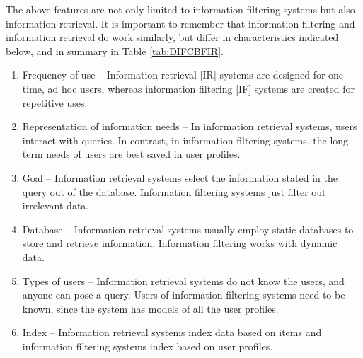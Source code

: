 The above features are not only limited to information filtering systems but also information retrieval. It is important to remember that information filtering and information retrieval do work similarly, but differ in characteristics indicated below, and in summary in Table \ref{tab:DIFCBFIR}.

\begin{enumerate}
    \item Frequency of use – Information retrieval [IR] systems are designed for one-time, ad hoc users, whereas information filtering [IF] systems are created for repetitive uses.
    \item Representation of information needs – In information retrieval systems, users interact with queries. In contrast, in information filtering systems, the long-term needs of users are best saved in user profiles.
    \item Goal – Information retrieval systems select the information stated in the query out of the database. Information filtering systems just filter out irrelevant data.
    \item Database – Information retrieval systems usually employ static databases to store and retrieve information. Information filtering works with dynamic data.
    \item Types of users – Information retrieval systems do not know the users, and anyone can pose a query. Users of information filtering systems need to be known, since the system has models of all the user profiles.
    \item Index – Information retrieval systems index data based on items and information filtering systems index based on user profiles.
\end{enumerate}

